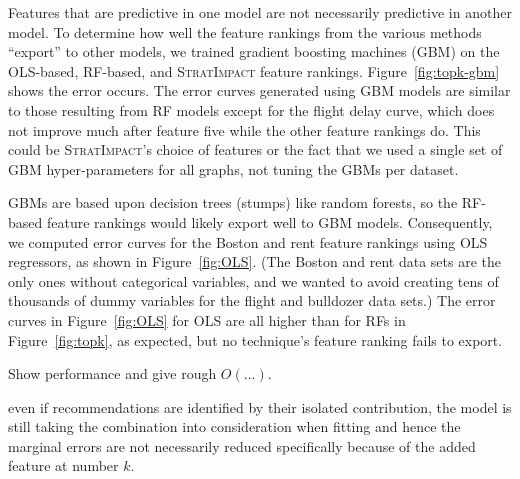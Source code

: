 \documentclass[11pt]{article}
\newcommand{\figref}[1]{Figure~\ref{#1}}
\newcommand{\simp}{\fontfamily{cmr}\textsc{\small StratImpact}}
\begin{document}
Features that are predictive in one model are not necessarily predictive in another model.  To determine how well the feature rankings from the various methods ``export'' to other models, we trained gradient boosting machines (GBM) on the OLS-based, RF-based, and \simp{} feature rankings. \figref{fig:topk-gbm} shows the error occurs.  The error curves generated using GBM models are similar to those resulting from RF models except for the flight delay curve, which does not improve much after feature five while the other feature rankings do.  This could be \simp's choice of features or the fact that we used a single set of GBM hyper-parameters for all graphs, not tuning the GBMs per dataset. 

GBMs are based upon decision trees (stumps) like random forests, so the RF-based feature rankings would likely export well to GBM models.   Consequently, we computed error curves for the Boston and rent feature rankings using OLS regressors, as shown in \figref{fig:OLS}. (The Boston and rent data sets are the only ones without categorical variables, and we wanted to avoid creating tens of thousands of dummy variables for the flight and bulldozer data sets.) The error curves in \figref{fig:OLS} for OLS are all higher than for RFs in \figref{fig:topk}, as expected, but no technique's feature ranking fails to export.

Show performance and give rough $O(...)$.

even if recommendations are identified by their isolated contribution, the model is still taking the combination into consideration when fitting and hence the marginal errors are not necessarily reduced specifically because of the added feature at number $k$.
\end{document}

